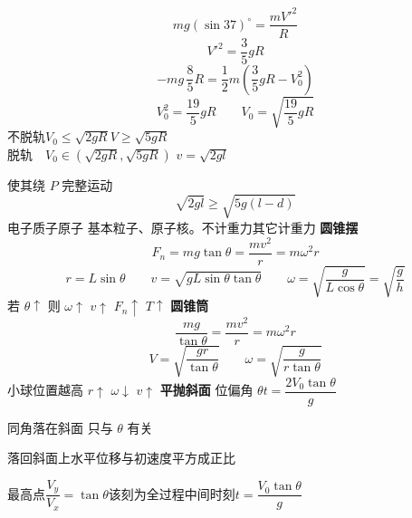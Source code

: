 \[
mg(\sin37)^\circ=\frac{mV'^2}{R}
\]
\[
V'^2=\frac35gR
\]
\[
-mg\,\frac85R=\frac12m\left(\frac35gR-V_0^2\right)
\]
\[
V_0^2=\frac{19}{5}gR\qquad V_0=\sqrt{\frac{19}{5}gR}
\]
不脱轨\quad $V_0\le\sqrt{2gR}$\quad $V\ge\sqrt{5gR}$ \\
脱轨\ \unclear{$\Rightarrow$}\ $V_0\in\left(\sqrt{2gR},\sqrt{5gR}\right)$
$v=\sqrt{2gl}$

使其绕 $P$ 完整运动
\[
\sqrt{2gl}\ge\sqrt{5g(l-d)}
\]
电子质子原子 %
基本粒子、原子核。不计重力\quad 其它计重力
\textbf{圆锥摆}
\[
F_n=mg\tan\theta=\frac{mv^2}{r}=m\omega^2r
\]
\[
r=L\sin\theta\qquad v=\sqrt{gL\sin\theta\tan\theta}\qquad \omega=\sqrt{\frac{g}{L\cos\theta}}=\sqrt{\frac{g}{h}}
\]
若 $\theta\uparrow$ 则 $\omega\uparrow$ $v\uparrow$ $F_n\uparrow$ $T\uparrow$
\textbf{圆锥筒}
\[
\frac{mg}{\tan\theta}=\frac{mv^2}{r}=m\omega^2r
\]
\[
V=\sqrt{\frac{gr}{\tan\theta}}\qquad \omega=\sqrt{\frac{g}{r\tan\theta}}
\]
小球位置越高 $r\uparrow$ $\omega\downarrow$ $v\uparrow$
\textbf{平抛斜面}
位偏角 $\theta$\quad $t=\dfrac{2V_0\tan\theta}{g}$

同角落在斜面 只与 $\theta$ 有关

落回斜面上水平位移与初速度平方成正比

最高点\quad $\dfrac{V_y}{V_x}=\tan\theta$\quad 该刻为全过程中间时刻\quad $t=\dfrac{V_0\tan\theta}{g}$

